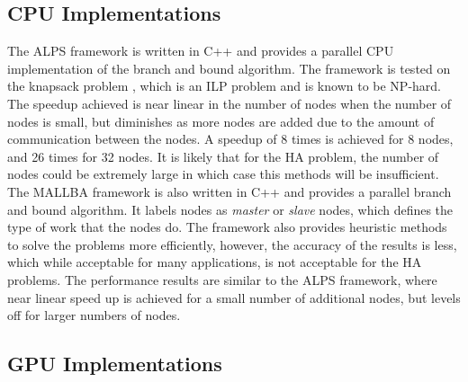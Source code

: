 \documentclass[10pt,twocolumn]{witseiepaper}
\begin{document}
\subsection{ CPU Implementations } \label{ssec:cpuimp}

The ALPS framework \cite{xu:2005} is written in C++ and provides a parallel CPU implementation of the branch
and bound algorithm. The framework is tested on the knapsack problem \cite{kedia:2005}, which is an ILP problem 
and is known to be NP-hard. The speedup achieved is near linear in the number of nodes when the number of 
nodes is small, but diminishes as more nodes are added due to the amount of communication between the nodes. 
A speedup of 8 times is achieved for 8 nodes, and 26 times for 32 nodes. It is likely that for the HA problem, 
the number of nodes could be extremely large in which case this methods will be insufficient. \\
The MALLBA framework \cite{alba:2002} is also written in C++ and provides a parallel branch and bound
algorithm. It labels nodes as \textit{master} or \textit{slave} nodes, which defines the type of work that the
nodes do. The framework also provides heuristic methods to solve the problems more efficiently, however, the
accuracy of the results is less, which while acceptable for many applications, is not acceptable for the HA
problems. The performance results are similar to the ALPS framework, where near linear speed up is achieved for
a small number of additional nodes, but levels off for larger numbers of nodes.

\subsection{ GPU Implementations } \label{ssec:gpuimp}
\end{document}
